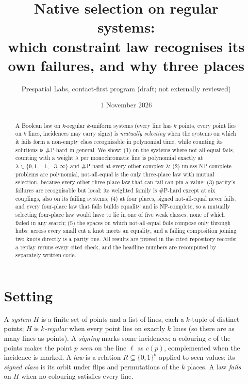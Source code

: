 \documentclass[11pt]{article}
\title{Native selection on regular systems:\\ which constraint law recognises its own failures, and why three places}
\author{Prespatial Labs, contact-first program (draft; not externally reviewed)}
\date{1 November 2026}
\theoremstyle{definition}
\begin{document}
\maketitle

\begin{abstract}
A Boolean law on $k$-regular $k$-uniform systems (every line has $k$ points, every point lies on $k$ lines, incidences may carry signs)
is \emph{mutually selecting} when the systems on which it fails form a non-empty class recognisable in polynomial time, while counting
its solutions is \#P-hard in general. We show:
(1) on the systems where not-all-equal fails, counting with a weight $\lambda$ per monochromatic line is polynomial exactly at
$\lambda\in\{0,1,-1,-3,\infty\}$ and \#P-hard at every other complex $\lambda$;
(2) unless NP-complete problems are polynomial, not-all-equal is the only three-place law with mutual selection, because every other
three-place law that can fail can pin a value;
(3) parity's failures are recognisable but local: its weighted family is \#P-hard except at six couplings, also on its failing systems;
(4) at four places, signed not-all-equal never fails, and every four-place law that fails builds equality and is NP-complete, so a
mutually selecting four-place law would have to lie in one of five weak classes, none of which failed in any search;
(5) the spaces on which not-all-equal fails compose only through hubs: across every small cut a knot meets an equality, and a failing
composition joining two knots directly is a parity one.
All results are proved in the cited repository records; a replay reruns every cited check, and the headline numbers are recomputed by
separately written code.
\end{abstract}

\section{Setting}

A \emph{system} $H$ is a finite set of points and a list of lines, each a $k$-tuple of distinct points; $H$ is \emph{$k$-regular} when every
point lies on exactly $k$ lines (so there are as many lines as points). A \emph{signing} marks some incidences; a colouring
$c$ of the points makes the point $p$ \emph{seen} on the line $\ell$ as $c(p)$, complemented when the incidence is marked. A \emph{law}
is a relation $R\subseteq\{0,1\}^k$ applied to seen values; its \emph{signed class} is its orbit under flips and permutations of the $k$
places. A law \emph{fails} on $H$ when no colouring satisfies every line.
\end{document}
